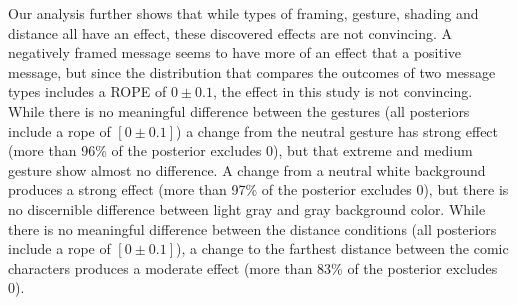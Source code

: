 Our analysis further shows that while types of framing, gesture, shading and distance all have an effect, these discovered effects are not convincing. A negatively framed message seems to have more of an effect that a positive message, but since the distribution that compares the outcomes of two message types includes a ROPE of $0 \pm 0.1$, the effect in this study is not convincing. While there is no meaningful difference between the gestures (all posteriors include a rope of $[0 \pm 0.1]$) a change from the neutral gesture has strong effect (more than 96\% of the posterior excludes 0), but that extreme and medium gesture show almost no difference. A change from a neutral white background produces a strong effect (more than 97\% of the posterior excludes 0), but there is no discernible difference between light gray and gray background color. While there  is no meaningful difference between the distance conditions (all posteriors include a rope of $[0 \pm 0.1]$), a change to the farthest distance between the comic characters produces a moderate effect (more than 83\% of the posterior excludes 0).






